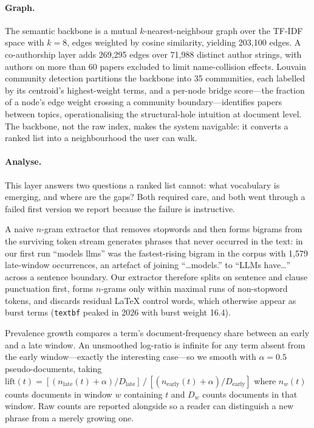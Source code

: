 \documentclass[runningheads]{llncs}
\begin{document}
\paragraph{Graph.}
The semantic backbone is a mutual $k$-nearest-neighbour graph over the TF-IDF space
with $k = 8$, edges weighted by cosine similarity, yielding 203{,}100 edges. A
co-authorship layer adds 269{,}295 edges over 71{,}988 distinct author strings, with
authors on more than 60 papers excluded to limit name-collision effects. Louvain
community detection \cite{blondel2008} partitions the backbone into 35 communities,
each labelled by its centroid's highest-weight terms, and a per-node bridge
score---the fraction of a node's edge weight crossing a community boundary---identifies
papers between topics, operationalising the structural-hole intuition \cite{burt2004}
at document level. The backbone, not the raw index, makes the system navigable: it
converts a ranked list into a neighbourhood the user can walk.

\paragraph{Analyse.}
\label{sec:analytics}
This layer answers two questions a ranked list cannot: what vocabulary is emerging,
and where are the gaps? Both required care, and both went through a failed first
version we report because the failure is instructive.

A naive $n$-gram extractor that removes stopwords and then forms bigrams from the
surviving token stream generates phrases that never occurred in the text: in our first
run ``models llms'' was the fastest-rising bigram in the corpus with 1{,}579 late-window
occurrences, an artefact of joining ``\dots models.'' to ``LLMs have\dots'' across a
sentence boundary. Our extractor therefore splits on sentence and clause punctuation
first, forms $n$-grams only within maximal runs of non-stopword tokens, and discards
residual \LaTeX{} control words, which otherwise appear as burst terms
(\texttt{textbf} peaked in 2026 with burst weight 16.4).

Prevalence growth compares a term's document-frequency share between an early and a late
window. An unsmoothed log-ratio is infinite for any term absent from the early
window---exactly the interesting case---so we smooth with $\alpha = 0.5$ pseudo-documents,
taking $\mathrm{lift}(t) = [(n_{\text{late}}(t)+\alpha)/D_{\text{late}}] \,/\,
[(n_{\text{early}}(t)+\alpha)/D_{\text{early}}]$ where $n_w(t)$ counts documents in
window $w$ containing $t$ and $D_w$ counts documents in that window. Raw counts are
reported alongside so a reader can distinguish a new phrase from a merely growing one.
\end{document}
